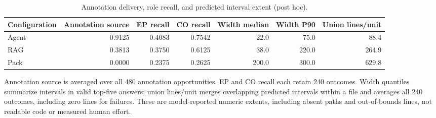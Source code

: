 \begin{table}[t]
\centering\small
\caption{Annotation delivery, role recall, and predicted interval extent (post hoc).}\label{tab:interval-detail}
\begin{adjustbox}{max width=\textwidth}\begin{tabular}{lrrrrrr}
\toprule
Configuration & Annotation source & EP recall & CO recall & Width median & Width P90 & Union lines/unit \\
\midrule
Agent & 0.9125 & 0.4083 & 0.7542 & 22.0 & 75.0 & 88.4 \\
RAG & 0.3813 & 0.3750 & 0.6125 & 38.0 & 220.0 & 264.9 \\
Pack & 0.0000 & 0.2375 & 0.2625 & 200.0 & 300.0 & 629.8 \\
\bottomrule
\end{tabular}\end{adjustbox}
\par\vspace{3pt}\begin{minipage}{\textwidth}\footnotesize Annotation source is averaged over all 480 annotation opportunities. EP and CO recall each retain 240 outcomes. Width quantiles summarize intervals in valid top-five answers; union lines/unit merges overlapping predicted intervals within a file and averages all 240 outcomes, including zero lines for failures. These are model-reported numeric extents, including absent paths and out-of-bounds lines, not readable code or measured human effort.\end{minipage}
\end{table}
